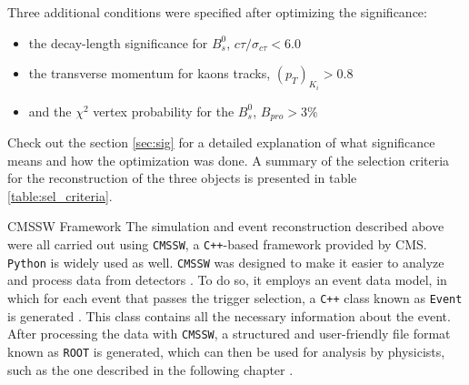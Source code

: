 Three additional conditions were specified after optimizing the significance:

\begin{itemize}
	\item the decay-length significance for $B^0_s$, $c\tau / \sigma_{c\tau} < 6.0 $
	\item the transverse momentum for kaons tracks, $(p_T)_{K_i} > 0.8$
	\item and the $\chi^2$ vertex probability for the $B^0_s$, $B_{pro} > 3 \%$
\end{itemize} 

Check out the section \ref{sec:sig} for a detailed explanation of what significance means and how the optimization was done. A summary of the selection criteria for the reconstruction of the three objects is presented in table \ref{table:sel_criteria}.
\begin{section}{CMSSW Framework}
The simulation and event reconstruction described above were all carried out using \verb|CMSSW|, a \verb|C++|-based framework provided by CMS. \verb|Python| is widely used as well. \verb|CMSSW| was designed to make it easier to analyze and process data from detectors \cite{di2020measurement, twiki2013}. To do so, it employs an event data model, in which for each event that passes the trigger selection, a \verb|C++| class known as \verb|Event| is generated \cite{fedi2016studies, muhammad2021measurement}. This class contains all the necessary information about the event. After processing the data with  \verb|CMSSW|, a structured and user-friendly file format known as  \verb|ROOT| is generated, which can then be used for analysis by physicists, such as the one described in the following chapter \cite{di2020measurement}.
\end{section}
\setlength{\tabcolsep}{0.5em} %
